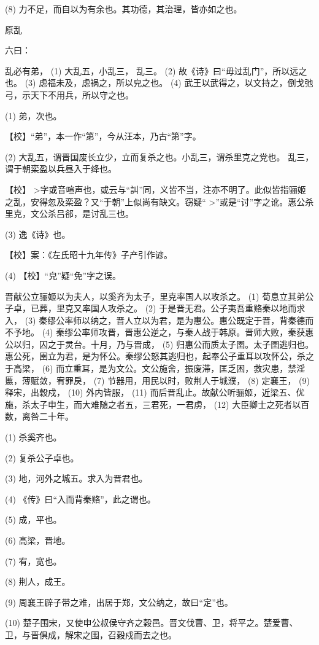 \documentclass[12pt,UTF8]{ctexbook}
\begin{document}
(8) 力不足，而自以为有余也。其功德，其治理，皆亦如之也。





原乱


六曰：

乱必有弟， (1) 大乱五，小乱三， 乱三。 (2) 故《诗》曰“毋过乱门”，所以远之也。 (3) 虑福未及，虑祸之，所以皃之也。 (4) 武王以武得之，以文持之，倒戈弛弓，示天下不用兵，所以守之也。

(1) 弟，次也。

【校】“弟”，本一作“第”，今从汪本，乃古“第”字。

(2) 大乱五，谓晋国废长立少，立而复杀之也。小乱三，谓杀里克之党也。 乱三，谓于朝栾盈以兵昼入于绛也。

【校】 >字或音喧声也，或云与“訆”同，义皆不当，注亦不明了。此似皆指骊姬之乱，安得忽及栾盈？又“于朝”上似尚有缺文。窃疑“ >”或是“讨”字之讹。惠公杀里克，文公杀吕郤，是讨乱三也。

(3) 逸《诗》也。

【校】案：《左氏昭十九年传》子产引作谚。

(4) 【校】“皃”疑“免”字之误。

晋献公立骊姬以为夫人，以奚齐为太子，里克率国人以攻杀之。 (1) 荀息立其弟公子卓，已葬，里克又率国人攻杀之。 (2) 于是晋无君。公子夷吾重赂秦以地而求入， (3) 秦缪公率师以纳之，晋人立以为君，是为惠公。惠公既定于晋，背秦德而不予地。 (4) 秦缪公率师攻晋，晋惠公逆之，与秦人战于韩原。晋师大败，秦获惠公以归，囚之于灵台。十月，乃与晋成， (5) 归惠公而质太子圉。太子圉逃归也。惠公死，圉立为君，是为怀公。秦缪公怒其逃归也，起奉公子重耳以攻怀公，杀之于高梁， (6) 而立重耳，是为文公。文公施舍，振废滞，匡乏困，救灾患，禁淫慝，薄赋敛，宥罪戾， (7) 节器用，用民以时，败荆人于城濮， (8) 定襄王， (9) 释宋，出穀戍， (10) 外内皆服， (11) 而后晋乱止。故献公听骊姬，近梁五、优施，杀太子申生，而大难随之者五，三君死，一君虏， (12) 大臣卿士之死者以百数，离咎二十年。

(1) 杀奚齐也。

(2) 复杀公子卓也。

(3) 地，河外之城五。求入为晋君也。

(4) 《传》曰“入而背秦赂”，此之谓也。

(5) 成，平也。

(6) 高梁，晋地。

(7) 宥，宽也。

(8) 荆人，成王。

(9) 周襄王辟子带之难，出居于郑，文公纳之，故曰“定”也。

(10) 楚子围宋，又使申公叔侯守齐之穀邑。晋文伐曹、卫，将平之。楚爱曹、卫，与晋俱成，解宋之围，召穀戍而去之也。
\end{document}
